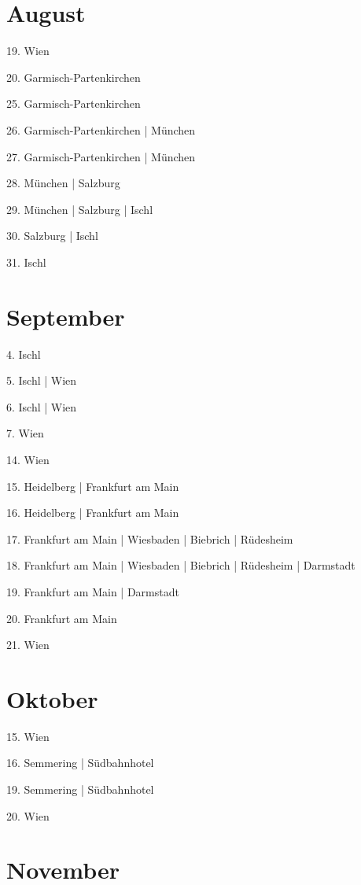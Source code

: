 \documentclass[twoside=false,titlepage=false,open=any, parskip=never, fontsize=10pt, headings=small, chapterprefix=false, appendixprefix=false, DIV=15]{scrbook}
\begin{document}
\begin{multicols}{3}
            \section*{August}
            19. Wien\par
            20. Garmisch-Partenkirchen\par
            25. Garmisch-Partenkirchen\par
            26. Garmisch-Partenkirchen | München\par
            27. Garmisch-Partenkirchen | München\par
            28. München | Salzburg\par
            29. München | Salzburg | Ischl\par
            30. Salzburg | Ischl\par
            31. Ischl\par
            \section*{September}
            4. Ischl\par
            5. Ischl | Wien\par
            6. Ischl | Wien\par
            7. Wien\par
            14. Wien\par
            15. Heidelberg | Frankfurt am Main\par
            16. Heidelberg | Frankfurt am Main\par
            17. Frankfurt am Main | Wiesbaden | Biebrich | Rüdesheim\par
            18. Frankfurt am Main | Wiesbaden | Biebrich | Rüdesheim | Darmstadt\par
            19. Frankfurt am Main | Darmstadt\par
            20. Frankfurt am Main\par
            21. Wien\par
            \section*{Oktober}
            15. Wien\par
            16. Semmering | Südbahnhotel\par
            19. Semmering | Südbahnhotel\par
            20. Wien\par
            \section*{November}

\end{multicols}
\end{document}
